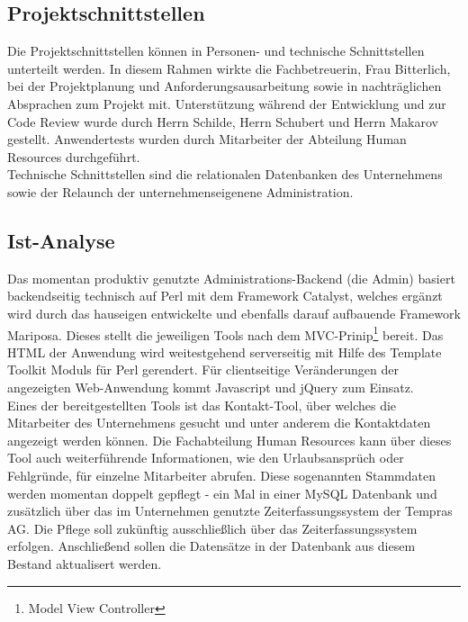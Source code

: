 \subsection{Projektschnittstellen}
    Die Projektschnittstellen können in Personen- und technische Schnittstellen unterteilt werden. In diesem Rahmen wirkte die Fachbetreuerin, Frau Bitterlich, bei der Projektplanung und Anforderungsausarbeitung sowie in nachträglichen Absprachen zum Projekt mit. Unterstützung während der Entwicklung und zur Code Review wurde durch Herrn Schilde, Herrn Schubert und Herrn Makarov gestellt. Anwendertests wurden durch Mitarbeiter der Abteilung Human Resources durchgeführt.\\
    Technische Schnittstellen sind die relationalen Datenbanken des Unternehmens sowie der Relaunch der unternehmenseigenene Administration.

\subsection{Ist-Analyse}
    Das momentan produktiv genutzte Administrations-Backend (\glqq die Admin\grqq{}) basiert backendseitig technisch auf Perl mit dem Framework \glqq Catalyst\grqq{}, welches ergänzt wird durch das hauseigen entwickelte und ebenfalls darauf aufbauende Framework \glqq Mariposa\grqq{}. Dieses stellt die jeweiligen Tools nach dem MVC-Prinip\footnote{Model View Controller} bereit. Das HTML der Anwendung wird weitestgehend serverseitig mit Hilfe des \glqq Template Toolkit\grqq{} Moduls für Perl gerendert. Für clientseitige Veränderungen der angezeigten Web-Anwendung kommt Javascript und jQuery zum Einsatz.\\
    Eines der bereitgestellten Tools ist das Kontakt-Tool, über welches die Mitarbeiter des Unternehmens gesucht und unter anderem die Kontaktdaten angezeigt werden können. Die Fachabteilung Human Resources kann über dieses Tool auch weiterführende Informationen, wie den Urlaubsansprüch oder Fehlgründe, für einzelne Mitarbeiter abrufen. Diese sogenannten Stammdaten werden momentan doppelt gepflegt - ein Mal in einer MySQL Datenbank und zusätzlich über das im Unternehmen genutzte Zeiterfassungssystem der Tempras AG. Die Pflege soll zukünftig ausschließlich über das Zeiterfassungssystem erfolgen. Anschließend sollen die Datensätze in der Datenbank aus diesem Bestand aktualisert werden.

